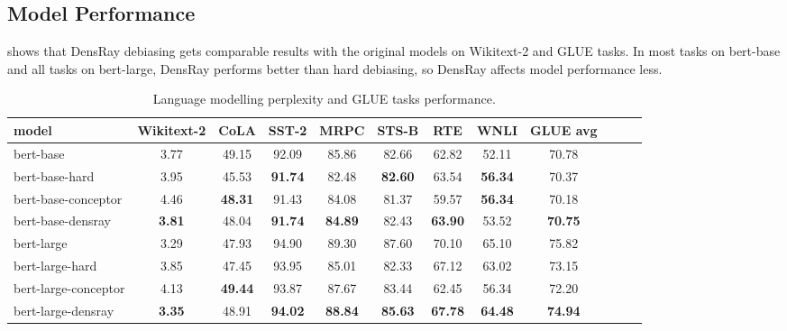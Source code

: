 \subsection{Model Performance}
 shows that DensRay debiasing gets comparable results with
the original models on Wikitext-2 and GLUE tasks. In most tasks on bert-base and all tasks on bert-large, DensRay performs better than hard debiasing, so DensRay affects model performance less.
\begin{table}[h]
\centering
\footnotesize
\begin{tabular}{l||c|cccccccccc}
model & Wikitext-2&CoLA &SST-2&MRPC&STS-B&RTE&WNLI&GLUE avg\\
\hline\hline
		bert-base &3.77&49.15&92.09&85.86&82.66&62.82&52.11&70.78\\
bert-base-hard &3.95&45.53&\textbf{91.74}&82.48&\textbf{82.60}&63.54&\textbf{56.34}&70.37\\
bert-base-conceptor &4.46&\textbf{48.31}&91.43&84.08&81.37&59.57&\textbf{56.34}&70.18\\
bert-base-densray &\textbf{3.81}&48.04&\textbf{91.74}&\textbf{84.89}&82.43&\textbf{63.90}&53.52&\textbf{70.75}\\
\hline
bert-large &3.29& 47.93&94.90&89.30&87.60&70.10&65.10&75.82\\
bert-large-hard &3.85& 47.45&93.95&85.01&82.33&67.12&63.02&73.15\\
bert-large-conceptor &4.13&\textbf{49.44}&93.87&87.67&83.44&62.45&56.34&72.20\\
bert-large-densray &\textbf{3.35}& 48.91&\textbf{94.02}&\textbf{88.84}&\textbf{85.63}&\textbf{67.78}&\textbf{64.48}&\textbf{74.94}\\
\end{tabular}
\caption{
Language modelling perplexity and GLUE tasks
performance. }
\end{table}


